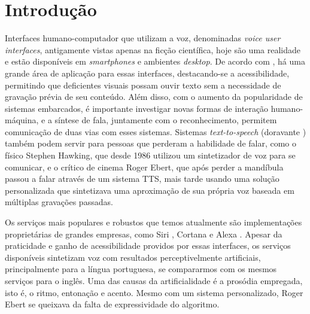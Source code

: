 

\chapter{Introdução}

Interfaces humano-computador que utilizam a voz, denominadas \emph{voice user
  interfaces}, antigamente vistas apenas na ficção científica, hoje são uma
realidade e estão disponíveis em \emph{smartphones} e ambientes \emph{desktop}.
De acordo com \cite{tts-book, martinjurafsky}, há uma grande área de aplicação
para essas interfaces, destacando-se a acessibilidade, permitindo que
deficientes visuais possam ouvir texto sem a necessidade de gravação prévia de
seu conteúdo. Além disso, com o aumento da popularidade de sistemas embarcados,
é importante investigar novas formas de interação humano-máquina, e a síntese de
fala, juntamente com o reconhecimento, permitem comunicação de duas vias com
esses sistemas. Sistemas \emph{text-to-speech} (doravante ) também podem servir para pessoas que perderam a habilidade de falar, como o físico Stephen Hawking, que desde 1986 utilizou um sintetizador de voz para se comunicar, e o crítico de cinema Roger Ebert, que após perder a mandíbula passou a falar através de um sistema TTS, mais tarde usando uma solução personalizada que sintetizava uma aproximação de sua própria voz baseada em múltiplas gravações passadas. 

Os serviços mais populares e robustos que temos atualmente são implementações proprietárias de grandes empresas, como Siri \cite{siri}, Cortana \cite{cortana} e Alexa \cite{alexa}. Apesar da praticidade e ganho de acessibilidade providos por essas interfaces, os serviços disponíveis sintetizam voz com resultados perceptivelmente artificiais, principalmente para a língua portuguesa, se compararmos com os mesmos serviços para o inglês. Uma das causas da artificialidade é a prosódia empregada, isto é, o ritmo, entonação e acento. Mesmo com um sistema personalizado, Roger Ebert se queixava da falta de expressividade do algoritmo.

